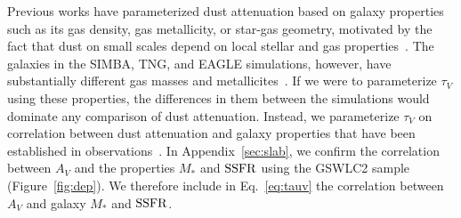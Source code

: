 Previous works have parameterized dust attenuation based on galaxy properties
such as its gas density, gas metallicity, or star-gas geometry, motivated by
the fact that dust on small scales depend on local stellar and gas
properties~\citep[\eg][]{somerville1999, somerville2012, steinacker2013,
camps2015, narayanan2018, trayford2020, vogelsberger2020}. 
The galaxies in the SIMBA, TNG, and EAGLE simulations, however, have
substantially different gas masses and metallicites~\citep[][Maller \etal~in prep.]{dave2020}.  
If we were to parameterize $\tau_V$ using these properties, the differences
in them between the simulations would dominate any comparison of dust attenuation.
Instead, we parameterize $\tau_V$ on correlation between dust attenuation
and galaxy properties that have been established in observations~\citep[\eg~][]{garn2010, battisti2016, salim2020}.
In Appendix~\ref{sec:slab}, we confirm the correlation between $A_V$ and
the properties $M_*$ and ${\rm SSFR}$ using the \cite{salim2018} GSWLC2 sample
(Figure~\ref{fig:dep}). 
We therefore include in Eq.~\ref{eq:tauv} the correlation between $A_V$ and
galaxy $M_*$ and ${\rm SSFR}$.



